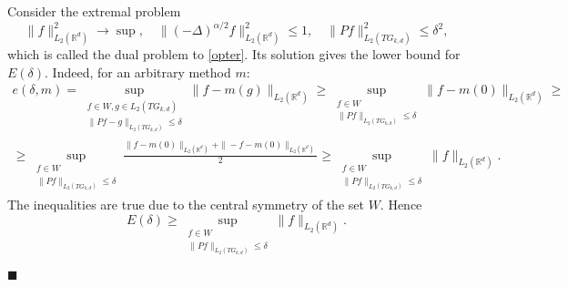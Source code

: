 \documentclass[12pt]{iopart}
\newenvironment{proof}
{\par\noindent{\bf Proof}}
{\hfill$\scriptstyle\blacksquare$}
\begin{document}
\begin{proof}
Consider the extremal problem
\[
  \|f\|^2_{L_2(\mathbb R^d)}\to\sup,\quad \|
  (-\Delta)^{\alpha/2}f\|^2_{L_2(\mathbb R^d)}\leqslant  1,\quad
  \|Pf\|^2_{L_2(TG_{k,d})}\leqslant  \delta^2,
\] which is called the dual problem to \eqref{opter}.
Its solution gives the lower bound for $E(\delta)$. Indeed, for an arbitrary method $m$:
\begin{multline*}
e(\delta,m)= \sup_{
\begin{smallmatrix}
f\in W, g\in L_2(TG_{k,d})\\ 
\|Pf-g\|_{L_2(TG_{k,d})}\leqslant \delta
\end{smallmatrix}}
\|f-m(g)\|_{L_2(\mathbb{R}^d)}\geqslant \sup_{
\begin{smallmatrix}
f\in W\\ 
\|Pf\|_{L_2(TG_{k,d})}\leqslant \delta
\end{smallmatrix}}
\|f-m(0)\|_{L_2(\mathbb{R}^d)}\geqslant \\
\geqslant \sup_{
\begin{smallmatrix}
f\in W\\ 
\|Pf\|_{L_2(TG_{k,d})}\leqslant \delta
\end{smallmatrix}}
\frac{\|f-m(0)\|_{L_2(\mathbb{R}^d)}+\|-f-m(0)\|_{L_2(\mathbb{R}^d)}}{2}\geqslant \sup_{
\begin{smallmatrix}
f\in W\\ 
\|Pf\|_{L_2(TG_{k,d})}\leqslant \delta
\end{smallmatrix}}
\|f\|_{L_2(\mathbb{R}^d)}.
\end{multline*}
The inequalities are true due to the central symmetry of the set $W$. Hence
$$E(\delta)\ge\sup_{
\begin{smallmatrix}
f\in W\\ 
\|Pf\|_{L_2(TG_{k,d})}\leqslant \delta
\end{smallmatrix}}
\|f\|_{L_2(\mathbb{R}^d)}.$$


\end{proof}
\end{document}
